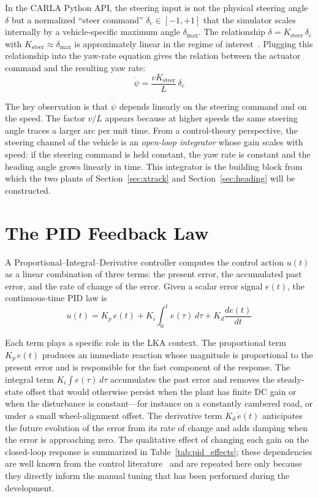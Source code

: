 In the CARLA Python API, the steering input is not the physical steering angle $\delta$ but a normalized \enquote{steer command} $\delta_c \in [-1, +1]$ that the simulator scales internally by a vehicle-specific maximum angle $\delta_{\max}$. The relationship $\delta = K_{\mathrm{steer}}\,\delta_c$ with $K_{\mathrm{steer}} \approx \delta_{\max}$ is approximately linear in the regime of interest~\cite{kebbati}. Plugging this relationship into the yaw-rate equation gives the relation between the actuator command and the resulting yaw rate:
\begin{equation}
    \dot{\psi} = \frac{v K_{\mathrm{steer}}}{L}\,\delta_c
\end{equation}
 
The key observation is that $\dot{\psi}$ depends linearly on the steering command and on the speed. The factor $v/L$ appears because at higher speeds the same steering angle traces a larger arc per unit time. From a control-theory perspective, the steering channel of the vehicle is an \emph{open-loop integrator} whose gain scales with speed: if the steering command is held constant, the yaw rate is constant and the heading angle grows linearly in time. This integrator is the building block from which the two plants of Section~\ref{sec:xtrack} and Section~\ref{sec:heading} will be constructed.


\section{The PID Feedback Law}
\label{sec:pid_theory}

A Proportional--Integral--Derivative controller computes the control action $u(t)$ as a linear combination of three terms: the present error, the accumulated past error, and the rate of change of the error. Given a scalar error signal $e(t)$, the continuous-time PID law is
\begin{equation}
    u(t) = K_p\, e(t) + K_i \int_0^t e(\tau)\,d\tau + K_d \frac{d e(t)}{d t}
    \label{eq:pid_cont}
\end{equation}

Each term plays a specific role in the \ac{LKA} context. The proportional term $K_p\, e(t)$ produces an immediate reaction whose magnitude is proportional to the present error and is responsible for the fast component of the response. The integral term $K_i \int e(\tau)\,d\tau$ accumulates the past error and removes the steady-state offset that would otherwise persist when the plant has finite DC gain or when the disturbance is constant---for instance on a constantly cambered road, or under a small wheel-alignment offset. The derivative term $K_d\, \dot{e}(t)$ anticipates the future evolution of the error from its rate of change and adds damping when the error is approaching zero. The qualitative effect of changing each gain on the closed-loop response is summarized in Table~\ref{tab:pid_effects}; these dependencies are well known from the control literature~\cite{astrom} and are repeated here only because they directly inform the manual tuning that has been performed during the development.
 
